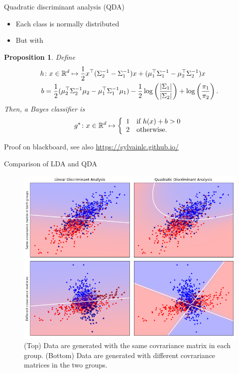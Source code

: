 \documentclass[xcolor={usenames,dvipsnames},handout]{beamer}
\newtheorem{prop}[theorem]{Proposition}
\begin{document}
\begin{frame}{Quadratic discriminant analysis (QDA)}
\begin{itemize}
\item Each class is normally distributed
\item But with 
\end{itemize}
		\begin{prop}
		Define
		\begin{align*}
			h &\colon x \in \mathbb{R}^d \mapsto \frac 12 x^\top (\Sigma_2^{-1}-\Sigma_1^{-1}) x + (\mu_1^\top\Sigma_1^{-1}-\mu_2^\top\Sigma_2^{-1})x \\
			b &= \frac 12 (\mu_2^\top\Sigma_2^{-1}\mu_2 - \mu_1^\top\Sigma_1^{-1}\mu_1) - \frac 12 \log \left( \frac{|\Sigma_1|}{|\Sigma_2|} \right) + \log \left( \frac{\pi_1}{\pi_2} \right).
		\end{align*}
		Then, a Bayes classifier is
		$$
			g^\star \colon x \in \mathbb{R}^d \mapsto
			\left\{ \begin{array}{ll}
				1 & \text{if } h(x) + b > 0 \\
				2 & \text{otherwise}.
			\end{array} \right.
		$$
	\end{prop}

		\centering
{\color{Vert} Proof on blackboard, see also \url{https://sylvainlc.github.io/}}

\end{frame}

\begin{frame}{Comparison of LDA and QDA}
	\begin{figure}[h]
		\center
		\includegraphics[height=0.75\textheight]{lda_plot}
		\caption{(Top) Data are generated with the same covrariance matrix in each group. (Bottom) Data are generated with different covrariance matrices in the two groups.}
		\label{fig:lda_qda}
	\end{figure}
\end{frame}
\end{document}
